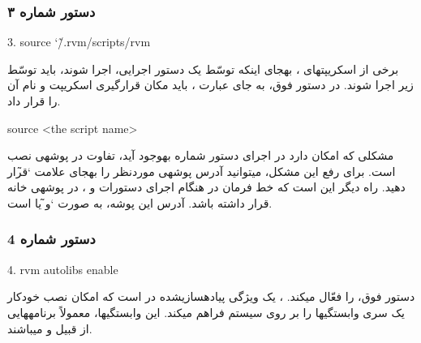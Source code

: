 \subsubsection{دستور شماره ۳}
\begin{latin}
\setlength{\parindent}{0ex}
3. source \char`\~/.rvm/scripts/rvm
\end{latin}
برخی از اسکریپت\nf های ، به\nf جای این\nf که توسّط یک دستور اجرایی، اجرا شوند، باید توسّط  زیر اجرا شوند. در دستور فوق، به جای عبارت ، باید مکان قرارگیری اسکریپت و نام آن را قرار داد.
 \begin{latin}
\setlength{\parindent}{0ex}
source  <the script name>
\end{latin}
مشکلی که امکان دارد در اجرای دستور شماره  به\nf وجود آید، تفاوت در پوشه\nf ی نصب  است. برای رفع این مشکل، می\nf توانید آدرس پوشه\nf ی موردنظر را به\nf جای علامت  \char`\~ قرار دهید. راه دیگر این است که خط فرمان در هنگام اجرای دستورات  و ، در پوشه\nf ی  خانه قرار داشته باشد. آدرس این پوشه، به صورت \char`\~ و یا  است.  


\subsubsection{دستور شماره 4}
\begin{latin}
\setlength{\parindent}{0ex}
4. rvm autolibs enable
\end{latin}
دستور فوق،  را فعّال می\nf کند. ، یک ویژگی پیاده\nf سازی\nf شده در  است که امکان نصب خودکار یک سری وابستگی\nf ها را بر روی سیستم فراهم می\nf کند. این وابستگی\nf ها، معمولاً برنامه\nf هایی از قبیل  و  می\nf باشند.


